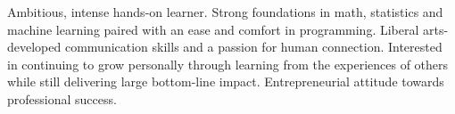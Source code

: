 

\begin{cvparagraph}

Ambitious, intense hands-on learner. Strong foundations
in math, statistics and machine learning paired with an ease and comfort in
programming. Liberal arts-developed communication skills and a passion
for human connection. Interested in continuing to grow personally through
learning from the experiences of others while still delivering large bottom-line
impact. Entrepreneurial attitude towards professional success.
\end{cvparagraph}
